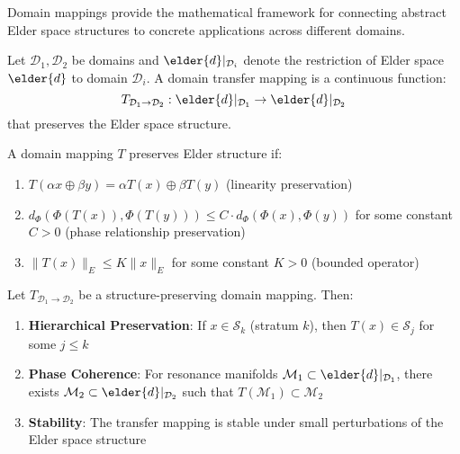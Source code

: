 Domain mappings provide the mathematical framework for connecting abstract Elder space structures to concrete applications across different domains.

\begin{definition}
Let $\mathcal{D}_1, \mathcal{D}_2$ be domains and $\elder{d}|_{\mathcal{D}_i}$ denote the restriction of Elder space $\elder{d}$ to domain $\mathcal{D}_i$. A domain transfer mapping is a continuous function:
\begin{equation}
T_{\mathcal{D}_1 \rightarrow \mathcal{D}_2}: \elder{d}|_{\mathcal{D}_1} \rightarrow \elder{d}|_{\mathcal{D}_2}
\end{equation}
that preserves the Elder space structure.
\end{definition}

\begin{definition}
A domain mapping $T$ preserves Elder structure if:
\begin{enumerate}
    \item $T(\alpha x \oplus \beta y) = \alpha T(x) \oplus \beta T(y)$ (linearity preservation)
    \item $d_{\Phi}(\Phi(T(x)), \Phi(T(y))) \leq C \cdot d_{\Phi}(\Phi(x), \Phi(y))$ for some constant $C > 0$ (phase relationship preservation)
    \item $\|T(x)\|_E \leq K \|x\|_E$ for some constant $K > 0$ (bounded operator)
\end{enumerate}
\end{definition}

\begin{theorem}
Let $T_{\mathcal{D}_1 \rightarrow \mathcal{D}_2}$ be a structure-preserving domain mapping. Then:
\begin{enumerate}
    \item \textbf{Hierarchical Preservation}: If $x \in \mathcal{S}_k$ (stratum $k$), then $T(x) \in \mathcal{S}_j$ for some $j \leq k$
    \item \textbf{Phase Coherence}: For resonance manifolds $\mathcal{M}_1 \subset \elder{d}|_{\mathcal{D}_1}$, there exists $\mathcal{M}_2 \subset \elder{d}|_{\mathcal{D}_2}$ such that $T(\mathcal{M}_1) \subset \mathcal{M}_2$
    \item \textbf{Stability}: The transfer mapping is stable under small perturbations of the Elder space structure
\end{enumerate}
\end{theorem}

